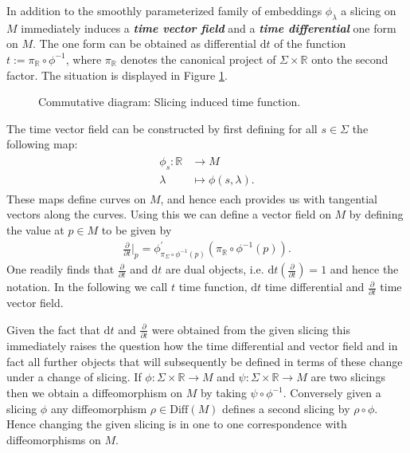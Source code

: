 \documentclass[a4paper,12pt, DIV=14, BCOR=5mm, twoside, headsepline, numbers=noenddot]{scrbook}
\begin{document}
In addition to the smoothly parameterized family of embeddings $\phi_{\lambda}$ a slicing on $M$ immediately induces a \textit{\textbf{time vector field}} and a \textit{\textbf{time differential}} one form on $M$. The one form can be obtained as differential $\mathrm{d}t$ of the function $t:=\pi_{\mathbb{R}} \circ \phi^{-1}$, where $\pi_{\mathbb{R}}$ denotes the canonical project of $\Sigma \times \mathbb{R}$ onto the second factor. The situation is displayed in Figure \ref{DiagrTime}.
\begin{figure}[hbt!]
\centering
{} 
\caption{Commutative diagram: Slicing induced time function.}\label{DiagrTime}
\end{figure}
The time vector field can be constructed by first defining for all $s \in \Sigma$ the following map: 
\begin{align}
\begin{aligned}
    \phi_s : \mathbb{R} &\longrightarrow M \\
    \lambda &\longmapsto \phi(s,\lambda).
\end{aligned}
\end{align}
These maps define curves on $M$, and hence each provides us with tangential vectors along the curves. Using this we can define a vector field on $M$ by defining the value at $p \in M$ to be given by
\begin{align}
\frac{\partial}{\partial t}\bigg \vert_p = \phi^{\prime}_{\pi_{\Sigma}\circ \phi^{-1}(p)} \left (\pi_{\mathbb{R}}\circ \phi^{-1}(p)\right ).
\end{align}
One readily finds that $\frac{\partial}{\partial t}$ and $\mathrm{d}t$ are dual objects, i.e. $\mathrm{d}t(\frac{\partial}{\partial t}) = 1$ and hence the notation. In the following we call $t$ time function, $\mathrm{d}t$ time differential and $\frac{\partial}{\partial t}$ time vector field.

Given the fact that $\mathrm{d}t$ and $\frac{\partial}{\partial t}$ were obtained from the given slicing this immediately raises the question how the time differential and vector field and in fact all further objects that will subsequently be defined in terms of these change under a change of slicing. If $\phi : \Sigma \times \mathbb{R} \rightarrow M $ and $\psi : \Sigma \times \mathbb{R} \rightarrow M$ are two slicings then we obtain a diffeomorphism on $M$ by taking $\psi \circ \phi^{-1}$. Conversely given a slicing $\phi$ any diffeomorphism $\rho \in \mathrm{Diff}(M)$ defines a second slicing by $\rho \circ \phi $. Hence changing the given slicing is in one to one correspondence with diffeomorphisms on $M$. 
\end{document}
